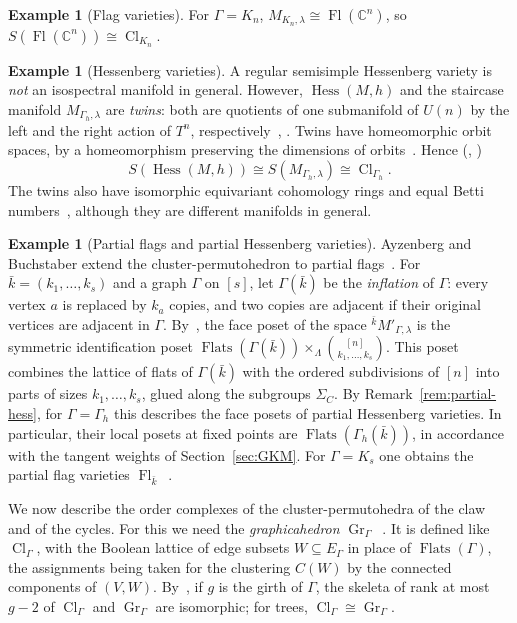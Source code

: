 \documentclass[11pt,a4paper]{article}
\numberwithin{equation}{section}
\theoremstyle{plain}
\theoremstyle{definition}
\newtheorem{example}[theorem]{Example}
\theoremstyle{remark}
\newcommand{\C}{\mathbb{C}}
\DeclareMathOperator{\Fl}{Fl}
\DeclareMathOperator{\Hess}{Hess}
\DeclareMathOperator{\Flats}{Flats}
\DeclareMathOperator{\Cl}{Cl}
\DeclareMathOperator{\GrH}{Gr}
\begin{document}
\begin{example}[Flag varieties]
For $\Gamma=K_n$, $M_{K_n,\lambda}\cong\Fl(\C^n)$, so $S(\Fl(\C^n))\cong\Cl_{K_n}$.
\end{example}

\begin{example}[Hessenberg varieties]\label{ex:hess-faces}
A regular semisimple Hessenberg variety is \emph{not} an isospectral manifold in general. However, $\Hess(M,h)$ and the staircase manifold $M_{\Gamma_h,\lambda}$ are \emph{twins}: both are quotients of one submanifold of $U(n)$ by the left and the right action of $T^n$, respectively~\cite[Thm.~1.1]{AB21}, \cite[§2.5]{AB24}. Twins have homeomorphic orbit spaces, by a homeomorphism preserving the dimensions of orbits~\cite[Prop.~2.42]{AB24}. Hence (\cite[Thm.~3.11]{AB21}, \cite[Cor.~2.43, 3.2]{AB24})
\[
S(\Hess(M,h))\cong S(M_{\Gamma_h,\lambda})\cong\Cl_{\Gamma_h}.
\]
The twins also have isomorphic equivariant cohomology rings and equal Betti numbers~\cite[Thm.~3.11]{AB21}, although they are different manifolds in general.
\end{example}

\begin{example}[Partial flags and partial Hessenberg varieties]\label{ex:partial-faces}
Ayzenberg and Buchstaber extend the cluster-permutohedron to partial flags~\cite[§5]{AB24}. For $\bar k=(k_1,\dots,k_s)$ and a graph $\Gamma$ on $[s]$, let $\Gamma(\bar k)$ be the \emph{inflation} of $\Gamma$: every vertex $a$ is replaced by $k_a$ copies, and two copies are adjacent if their original vertices are adjacent in $\Gamma$. By~\cite[Thm.~2]{AB24}, the face poset of the space ${}^{\bar k}M'_{\Gamma,\lambda}$ is the symmetric identification poset $\Flats(\Gamma(\bar k))\times_\Lambda\binom{[n]}{k_1,\dots,k_s}$. This poset combines the lattice of flats of $\Gamma(\bar k)$ with the ordered subdivisions of $[n]$ into parts of sizes $k_1,\dots,k_s$, glued along the subgroups $\Sigma_C$. By Remark~\ref{rem:partial-hess}, for $\Gamma=\Gamma_h$ this describes the face posets of partial Hessenberg varieties. In particular, their local posets at fixed points are $\Flats(\Gamma_h(\bar k))$, in accordance with the tangent weights of Section~\ref{sec:GKM}. For $\Gamma=K_s$ one obtains the partial flag varieties $\Fl_{\bar k}$~\cite[Prop.~5.12]{AB24}.
\end{example}

We now describe the order complexes of the cluster-permutohedra of the claw and of the cycles. For this we need the \emph{graphicahedron} $\GrH_\Gamma$~\cite[Constr.~2.15, Def.~2.16]{AB24}. It is defined like $\Cl_\Gamma$, with the Boolean lattice of edge subsets $W\subseteq E_\Gamma$ in place of $\Flats(\Gamma)$, the assignments being taken for the clustering $C(W)$ by the connected components of $(V,W)$. By~\cite[Thm.~1(4)]{AB24}, if $g$ is the girth of $\Gamma$, the skeleta of rank at most $g-2$ of $\Cl_\Gamma$ and $\GrH_\Gamma$ are isomorphic; for trees, $\Cl_\Gamma\cong\GrH_\Gamma$.
\end{document}
